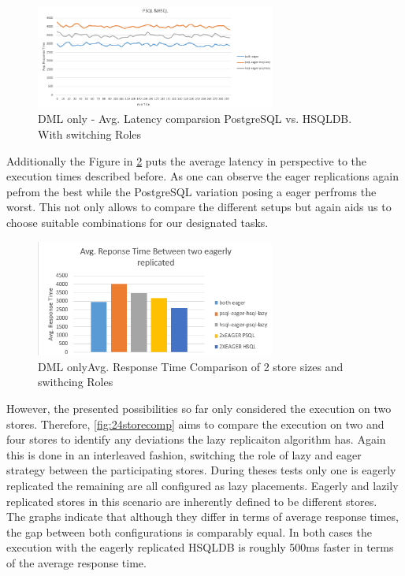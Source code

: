 \begin{figure}[t] 
    \centering 
    \includegraphics[width=0.7\textwidth]{Figures/PSQ_HSQL_DML_only.PNG}
    \caption{DML only - Avg. Latency comparsion PostgreSQL vs. HSQLDB. With switching Roles}
    \label{fig:psqlhsqlresponse}
\end{figure}

Additionally the Figure in \ref{fig:overall_comp} puts the average latency in perspective to the execution times described before.
As one can observe the eager replications again pefrom the best while the PostgreSQL variation posing a eager perfroms the worst.
This not only allows to compare the different setups but again aids us to choose suitable combinations for our designated tasks.\\



\begin{figure}[t] 
    \centering 
    \includegraphics[width=0.7\textwidth]{Figures/psq_hsql_avg.response2.PNG}
    \caption{DML onlyAvg. Response Time Comparison of 2 store sizes and swithcing Roles}
    \label{fig:overall_comp}
\end{figure}



However, the presented possibilities so far only considered the execution on two stores. Therefore, \ref{fig:24storecomp} aims
to compare the execution on two and four stores to identify any deviations the lazy replicaiton algorithm has. 
Again this is done in an interleaved fashion, switching the role of lazy and eager strategy between the participating stores.
During theses tests only one is eagerly replicated the remaining are all configured as lazy placements. Eagerly and lazily replicated stores
in this scenario are inherently defined to be different stores.\\
The graphs indicate that although they differ in terms of average response times, the gap between both configurations is comparably equal.
In both cases the execution with the eagerly replicated HSQLDB is roughly 500ms faster in terms of the average response time.\\


